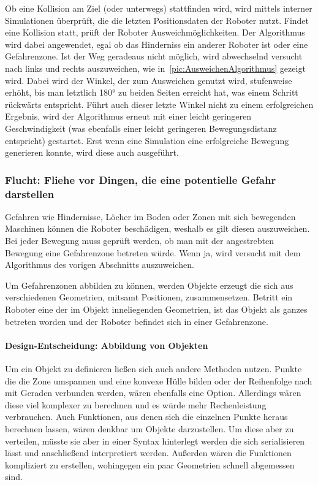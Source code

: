 Ob eine Kollision am Ziel (oder unterwegs) stattfinden wird, wird mittels interner Simulationen überprüft, die die letzten Positionsdaten der Roboter nutzt.
Findet eine Kollision statt, prüft der Roboter Ausweichmöglichkeiten. Der Algorithmus wird dabei angewendet, egal ob das Hinderniss ein anderer Roboter ist oder eine Gefahrenzone. Ist der Weg geradeaus nicht möglich, wird abwechselnd versucht nach links und rechts auszuweichen, wie in~\autoref{pic:AusweichenAlgorithmus} gezeigt wird. Dabei wird der Winkel, der zum Ausweichen genutzt wird, stufenweise erhöht, bis man letztlich 180° zu beiden Seiten erreicht hat, was einem Schritt rückwärts entspricht. Führt auch dieser letzte Winkel nicht zu einem erfolgreichen Ergebnis, wird der Algorithmus erneut mit einer leicht geringeren Geschwindigkeit (was ebenfalls einer leicht geringeren Bewegungsdistanz entspricht) gestartet. Erst wenn eine Simulation eine erfolgreiche Bewegung generieren konnte, wird diese auch ausgeführt.

\subsubsection*{Flucht: Fliehe vor Dingen, die eine potentielle Gefahr darstellen}

Gefahren wie Hindernisse, Löcher im Boden oder Zonen mit sich bewegenden Maschinen können die Roboter beschädigen, weshalb es gilt diesen auszuweichen. Bei jeder Bewegung muss geprüft werden, ob man mit der angestrebten Bewegung eine Gefahrenzone betreten würde. Wenn ja, wird versucht mit dem Algorithmus des vorigen Abschnitts auszuweichen.

Um Gefahrenzonen abbilden zu können, werden Objekte erzeugt die sich aus verschiedenen Geometrien, mitsamt Positionen, zusammensetzen. Betritt ein Roboter eine der im Objekt inneliegenden Geometrien, ist das Objekt als ganzes betreten worden und der Roboter befindet sich in einer Gefahrenzone.

\paragraph*{Design-Entscheidung: Abbildung von Objekten}
Um ein Objekt zu definieren ließen sich auch andere Methoden nutzen. Punkte die die Zone umspannen und eine konvexe Hülle bilden oder der Reihenfolge nach mit Geraden verbunden werden, wären ebenfalls eine Option. Allerdings wären diese viel komplexer zu berechnen und es würde mehr Rechenleistung verbrauchen.
Auch Funktionen, aus denen sich die einzelnen Punkte heraus berechnen lassen, wären denkbar um Objekte darzustellen. Um diese aber zu verteilen, müsste sie aber in einer Syntax hinterlegt werden die sich serialisieren lässt und anschließend interpretiert werden. Außerden wären die Funktionen kompliziert zu erstellen, wohingegen ein paar Geometrien schnell abgemessen sind.

